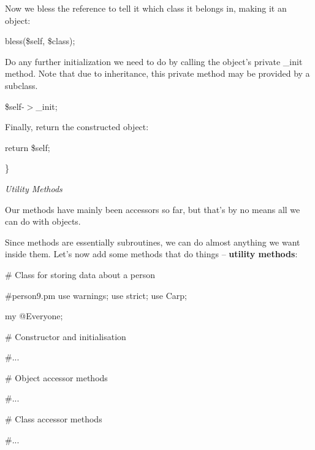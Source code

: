 \documentclass[a4paper,11pt]{book}
\begin{document}
\noindent 

\noindent Now we bless the reference to tell it which class it belongs in, making it an object:

\noindent 

\noindent 

\noindent bless(\$self, \$class);

\noindent 

\noindent Do any further initialization we need to do by calling the object's private \_init method. Note that due to inheritance, this private method may be provided by a subclass.

\noindent 

\noindent \$self-$>$\_init;

\noindent 

\noindent 

\noindent Finally, return the constructed object:

\noindent 

\noindent 

\noindent return \$self;

\noindent \}

\noindent 

\noindent \textit{Utility Methods}

\noindent Our methods have mainly been accessors so far, but that's by no means all we can do with objects.

\noindent Since methods are essentially subroutines, we can do almost anything we want inside them. Let's now add some methods that do things -- \textbf{utility methods}:

\noindent 

\noindent \# Class for storing data about a person

\noindent \#person9.pm use warnings; use strict; use Carp;

\noindent 

\noindent my @Everyone;

\noindent 

\noindent \# Constructor and initialisation

\noindent \#...

\noindent 

\noindent \# Object accessor methods

\noindent \#...

\noindent 

\noindent \# Class accessor methods

\noindent \#...
\end{document}
